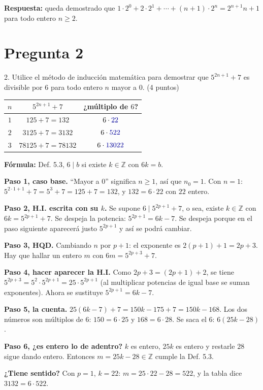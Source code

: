 \documentclass[11pt]{article}
\begin{document}
\textbf{Respuesta:} queda demostrado que $1\cdot 2^0+2\cdot 2^1+\cdots+(n+1)\cdot 2^n=2^{n+1}n+1$ para todo entero $n\ge 2$.

\clearpage
\section*{Pregunta 2}

2. Utilice el método de inducción matemática para demostrar que $5^{2n+1}+7$ es \colorbox{green!35}{divisible por 6} para todo entero \colorbox{green!35}{$n$ mayor a 0}. \hfill (4 puntos)

\begin{center}\small
\renewcommand{\arraystretch}{1.1}
\begin{tabular}{|c|c|c|}
\hline
$n$ & $5^{2n+1}+7$ & ¿múltiplo de $6$?\\ \hline
$1$ & $125+7=132$ & $6\cdot\textcolor{blue!60!black}{22}$\\ \hline
$2$ & $3125+7=3132$ & $6\cdot\textcolor{blue!60!black}{522}$\\ \hline
$3$ & $78125+7=78132$ & $6\cdot\textcolor{blue!60!black}{13022}$\\ \hline
\end{tabular}
\end{center}


\begin{explica}
\textbf{Fórmula:} Def. 5.3, $6\mid b$ si existe $k\in\mathbb Z$ con $6k=b$.

\textbf{Paso 1, caso base.} ``Mayor a 0'' significa $n\ge1$, así que $n_0=1$. Con $n=1$: $5^{2\cdot1+1}+7=5^3+7=125+7=132$, y $132=6\cdot22$ con $22$ entero.

\textbf{Paso 2, H.I. escrita con su $k$.} Se supone $6\mid 5^{2p+1}+7$, o sea, existe $k\in\mathbb Z$ con $6k=5^{2p+1}+7$. Se despeja la potencia: $5^{2p+1}=6k-7$. Se despeja porque en el paso siguiente aparecerá justo $5^{2p+1}$ y así se podrá cambiar.

\textbf{Paso 3, HQD.} Cambiando $n$ por $p+1$: el exponente es $2(p+1)+1=2p+3$. Hay que hallar un entero $m$ con $6m=5^{2p+3}+7$.

\textbf{Paso 4, hacer aparecer la H.I.} Como $2p+3=(2p+1)+2$, se tiene $5^{2p+3}=5^2\cdot5^{2p+1}=25\cdot5^{2p+1}$ (al multiplicar potencias de igual base se suman exponentes). Ahora se sustituye $5^{2p+1}=6k-7$.

\textbf{Paso 5, la cuenta.} $25(6k-7)+7=150k-175+7=150k-168$. Los dos números son múltiplos de $6$: $150=6\cdot25$ y $168=6\cdot 28$. Se saca el $6$: $6(25k-28)$.

\textbf{Paso 6, ¿es entero lo de adentro?} $k$ es entero, $25k$ es entero y restarle $28$ sigue dando entero. Entonces $m=25k-28\in\mathbb Z$ cumple la Def. 5.3.

\textbf{¿Tiene sentido?} Con $p=1$, $k=22$: $m=25\cdot22-28=522$, y la tabla dice $3132=6\cdot522$.
\end{explica}
\end{document}
